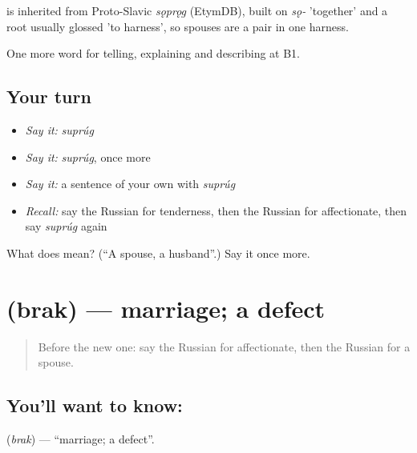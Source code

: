 \begin{cousinweb}
\emph{} is inherited from Proto-Slavic \emph{sǫprǫg} (EtymDB), built on \emph{sǫ-} 'together' and a root usually glossed 'to harness', so spouses are a pair in one harness.
\end{cousinweb}

\begin{grammarlens}[title={What you've built}]
One more word for telling, explaining and describing at B1.
\end{grammarlens}

\subsection*{Your turn}
\begin{itemize}
\raggedright
  \item \emph{Say it:} \emph{suprúg}
  \item \emph{Say it:} \emph{suprúg}, once more
  \item \emph{Say it:} a sentence of your own with \emph{suprúg}
  \item \emph{Recall:} say the Russian for tenderness, then the Russian for affectionate, then say \emph{suprúg} again
\end{itemize}

\begin{tcolorbox}[breakable,colback=teal!4,colframe=teal!35!black,title={Before you move on}]
What does  mean? (\textquotedblleft{}A spouse, a husband\textquotedblright{}.) Say it once more.
\end{tcolorbox}
\section[\texorpdfstring{\ru{брак} (brak)}{брак (brak)}]{ (brak) — marriage; a defect}

\label{lesson:RU-C494-brak}



\begin{quote}
Before the new one: say the Russian for affectionate, then the Russian for a spouse.
\end{quote}

\subsection*{You'll want to know: }
\textbf{} (\emph{brak}) — \textquotedblleft{}marriage; a defect\textquotedblright{}.

